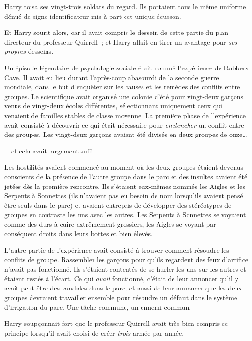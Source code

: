 Harry toisa ses vingt-trois soldats du regard.
Ils portaient tous le même uniforme dénué de signe identificateur mis à part cet unique écusson.

Et Harry sourit alors, car il avait compris le dessein de cette partie du plan directeur du professeur Quirrell~; et Harry allait en tirer un avantage pour \emph{ses propres} desseins.

Un épisode légendaire de psychologie sociale était nommé l'expérience de Robbers Cave.
Il avait eu lieu durant l'après-coup abasourdi de la seconde guerre mondiale, dans le but d'enquêter sur les causes et les remèdes des conflits entre groupes.
Le scientifique avait organisé une colonie d'été pour vingt-deux garçons venus de vingt-deux écoles différentes, sélectionnant uniquement ceux qui venaient de familles stables de classe moyenne.
La première phase de l'expérience avait consisté à découvrir ce qui était nécessaire pour \emph{enclencher} un conflit entre des groupes.
Les vingt-deux garçons avaient été divisés en deux groupes de onze…

… et cela avait largement suffi.

Les hostilités avaient commencé au moment où les deux groupes étaient devenus conscients de la présence de l'autre groupe dans le parc et des insultes avaient été jetées dès la première rencontre.
Ils s'étaient eux-mêmes nommés les Aigles et les Serpents à Sonnettes (ils n'avaient pas eu besoin de nom lorsqu'ils avaient pensé être seuls dans le parc) et avaient entrepris de développer des stéréotypes de groupes en contraste les uns avec les autres.
Les Serpents à Sonnettes se voyaient comme des durs à cuire extrêmement grossiers, les Aigles se voyant par conséquent droits dans leurs bottes et bien élevés.

L'autre partie de l'expérience avait consisté à trouver comment résoudre les conflits de groupe.
Rassembler les garçons pour qu'ils regardent des feux d'artifice n'avait pas fonctionné.
Ils s'étaient contentés de se hurler les uns sur les autres et étaient restés à l'écart.
Ce qui \emph{avait} fonctionné, c'était de leur annoncer qu'il y avait peut-être des vandales dans le parc, et aussi de leur annoncer que les deux groupes devraient travailler ensemble pour résoudre un défaut dans le système d'irrigation du parc.
Une tâche commune, un ennemi commun.

Harry soupçonnait fort que le professeur Quirrell avait très bien compris ce principe lorsqu'il avait choisi de créer \emph{trois} armée par année.


